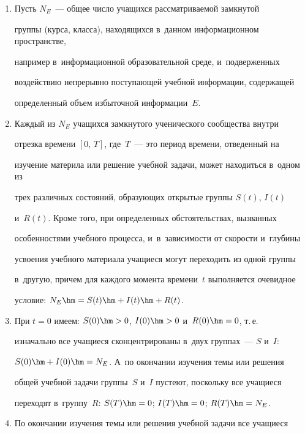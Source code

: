   \begin{enumerate}[1.]


  \item Пусть $N_E$~--- общее чис\-ло учащихся рассматриваемой замкнутой 


группы (курса, класса), находящихся в~данном информационном пространстве, 


например в~информационной образовательной среде, и~подверженных 


воздействию непрерывно по\-сту\-па\-ющей учебной информации, содержащей 


определенный объем избыточной информации~$E$.


\item Каждый из $N_E$ учащихся замк\-ну\-то\-го ученического сообщества внут\-ри 


отрезка времени $[0,\,T]$, где~$T$~--- это период времени, отведенный на 


изучение материла или решение учебной задачи, может находиться в~одном из 


трех различных со\-сто\-яний, обра\-зу\-ющих открытые группы $S(t)$, $I(t)$ 


и~$R(t)$. Кроме того, при определенных обстоятельствах, вызванных 


особенностями учебного процесса, и~в~за\-ви\-си\-мости от ско\-рости и~глубины 


усво\-ения учебного материала учащиеся могут переходить из одной группы 


в~другую, причем для каждого момента времени~$t$ выполняется очевидное 


условие: $N_E\hm = S(t) \hm+ I(t) \hm+ R(t)$. 


\item При $t = 0$ имеем: $S(0) \hm> 0$, $I(0) \hm> 0$ и~$R(0) \hm= 0$, т.\,е.\ 


изначально все учащиеся сконцентрированы в~двух группах~--- $S$ и~$I$: 


$S(0) \hm+ I(0) \hm= N_E$. А~по окончании изучения темы или решения 


общей учебной задачи группы~$S$ и~$I$ пустеют, поскольку все учащиеся 


переходят в~группу~$R$: $S(T) \hm= 0$; $I(T) \hm= 0$; $R(T) \hm= N_E$.





\item По окончании изучения темы или решения учебной задачи все учащиеся 



\end{enumerate}
